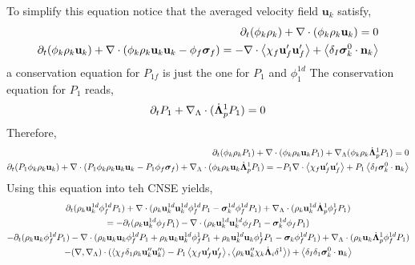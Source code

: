 \documentclass[11pt]{My_preprint}
\begin{document}
To simplify this equation notice that the averaged velocity field $\textbf{u}_k$ satisfy, 
\begin{align}
    \partial_t (\phi_k \rho_k)  
    + \mathbf{\nabla}\cdot (
        \phi_k \rho_k\textbf{u}_k
    )
    = 
    0\\
    \partial_t (\phi_k \rho_k\textbf{u}_k)  
    + \mathbf{\nabla}\cdot (
        \phi_k \rho_k\textbf{u}_k\textbf{u}_k
        - \phi_f\bm\sigma_f
    )
    = 
    - \mathbf{\nabla}\cdot\left<\chi_f\textbf{u}_f' \textbf{u}_f'\right>
    + \left<\delta_I \bm{\sigma}_k^0 \cdot \textbf{n}_k\right>
\end{align}
a conservation equation for $P_{1f}$ is just the one for $P_1$ and $\phi_1^{1d}$
The conservation equation for $P_1$ reads, 
\begin{equation}
    \partial_t P_1 +\mathbf{\nabla}_\Lambda\cdot(\dot{\bm\Lambda}_p^1 P_1) = 0 
\end{equation} 
Therefore, 
\begin{align*}
    \partial_t (\phi_k \rho_k P_1 )  
    + \mathbf{\nabla}\cdot (\phi_k \rho_k\textbf{u}_k P_1)
    + \mathbf{\nabla}_\Lambda (\phi_k \rho_k\dot{\bm\Lambda}_p^1 P_1)
    = 
    0\\
    \partial_t (P_1 \phi_k \rho_k\textbf{u}_k)  
    + \mathbf{\nabla}\cdot (
        P_1 \phi_k \rho_k\textbf{u}_k\textbf{u}_k
        - P_1 \phi_f\bm\sigma_f
    )
    + \mathbf{\nabla}_\Lambda\cdot(\phi_k \rho_k \textbf{u}_k \dot{\bm\Lambda}_p^1 P_1)
    = 
    - P_1 \mathbf{\nabla}\cdot\left<\chi_f\textbf{u}_f' \textbf{u}_f'\right>
    + P_1 \left<\delta_I \bm{\sigma}_k^0 \cdot \textbf{n}_k\right>
\end{align*}
Using this equation into teh CNSE yields, 
\begin{multline}
    \partial_t (\rho_k \textbf{u}_k^{1d}  \phi_f^{1d} P_1)
    + \mathbf{\nabla}\cdot (
     \rho_k \textbf{u}_k^{1d} \textbf{u}_k^{1d}  \phi_f^{1d} P_1
    - \bm\sigma_k^{1d} \phi_f^{1d} P_1
    )
    +  \mathbf{\nabla}_\Lambda \cdot ( \rho_k \textbf{u}_k^{1d} \dot{\bm\Lambda}_p^1  \phi_f^1 P_1 )\\
    = 
    - \partial_t (\rho_k \textbf{u}_k^{1d}  \phi_f P_1)
    - \mathbf{\nabla}\cdot (
    \rho_k \textbf{u}_k^{1d} \textbf{u}_k^{1d}  \phi_f P_1
    - \bm\sigma_k^{1d} \phi_f P_1
    )
    \\
    - \partial_t (\rho_k \textbf{u}_k  \phi_f^{1d} P_1)
    - \mathbf{\nabla}\cdot (
        \rho_k \textbf{u}_k \textbf{u}_k  \phi_f^{1d} P_1
        + \rho_k \textbf{u}_k \textbf{u}_k^{1d}  \phi_f^1 P_1
        + \rho_k \textbf{u}_k^{1d} \textbf{u}_k  \phi_f^1 P_1
        - \bm\sigma_k \phi_f^{1d} P_1
        )
    +  \mathbf{\nabla}_\Lambda \cdot ( \rho_k \textbf{u}_k \dot{\bm\Lambda}_p^1 \phi_f^{1d} P_{1} )\\
    - (\mathbf{\nabla},\mathbf{\nabla}_\Lambda)\cdot(\left<\chi_f \delta_1 \rho_k \textbf{u}''_k\textbf{u}''_k\right> 
    - P_1 \left<\chi_f \textbf{u}_f'\textbf{u}_f'\right>,\left<\rho_k \textbf{u}_k'' \chi_k \dot{\bm\Lambda}_i \delta^1\right>)
    + \left<\delta_I\delta_1
         \bm\sigma_k^0
    \cdot \textbf{n}_k\right>\\ 
\end{multline}
\end{document}
